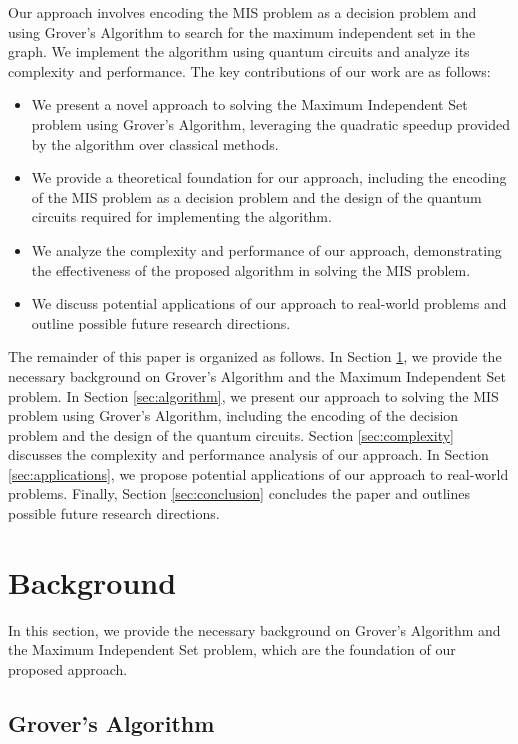 Our approach involves encoding the MIS problem as a decision problem and using Grover's Algorithm to search for the maximum independent set in the graph. We implement the algorithm using quantum circuits and analyze its complexity and performance. The key contributions of our work are as follows:

\begin{itemize}
    \item We present a novel approach to solving the Maximum Independent Set problem using Grover's Algorithm, leveraging the quadratic speedup provided by the algorithm over classical methods.
    \item We provide a theoretical foundation for our approach, including the encoding of the MIS problem as a decision problem and the design of the quantum circuits required for implementing the algorithm.
    \item We analyze the complexity and performance of our approach, demonstrating the effectiveness of the proposed algorithm in solving the MIS problem.
    \item We discuss potential applications of our approach to real-world problems and outline possible future research directions.
\end{itemize}

The remainder of this paper is organized as follows. In Section \ref{sec:background}, we provide the necessary background on Grover's Algorithm and the Maximum Independent Set problem. In Section \ref{sec:algorithm}, we present our approach to solving the MIS problem using Grover's Algorithm, including the encoding of the decision problem and the design of the quantum circuits. Section \ref{sec:complexity} discusses the complexity and performance analysis of our approach. In Section \ref{sec:applications}, we propose potential applications of our approach to real-world problems. Finally, Section \ref{sec:conclusion} concludes the paper and outlines possible future research directions.

\section{Background}
\label{sec:background}

In this section, we provide the necessary background on Grover's Algorithm and the Maximum Independent Set problem, which are the foundation of our proposed approach.

\subsection{Grover's Algorithm}
\label{subsec:grover}


